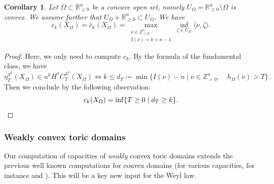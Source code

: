 \documentclass[11pt]{amsart}
\numberwithin{equation}{section}
\theoremstyle{plain}
\newtheorem{Coro}[coro]{Corollary}
\theoremstyle{definition}
\theoremstyle{remark}
\newcommand{\bZ} { {\mathbb{Z}}}
\newcommand{\bR} { {\mathbb{R}}}
\begin{document}
\begin{Coro}\label{prop: concave capacity}Let $\Omega \subset \bR^n_{\geq0}$ be a concave open set, namely $U_{\Omega}=\mathbb R_{\geq0}^n\setminus\Omega$ is convex. We assume further that $U_\Omega+\bR^n_{\geq 0} \subset U_\Omega$.  We have
\[{c}_k(X_{\Omega})
=
\widehat{c}_k(X_{\Omega})
=
\max_{\substack{\nu\in\bZ_{>0}^n\\ I(\nu)=k+n-1}}    
\inf_{\zeta\in {U_{\Omega}}}
\langle \nu,\zeta\rangle   .
\]

\end{Coro}\begin{proof}Here, we only need to compute $c_k$. By the formula of the fundamental class, we have
\[\eta_T^{S^1}(X_\Omega) \in u^kH^*C_T^{S^1}(X_\Omega) \iff k\leq d_T\coloneqq \min\{I(\nu)-n\mid \nu\in \bZ^n_{>0},\quad h_\Omega(\nu)>T\}.\]
Then we conclude by the following observation:
\[{c}_k(X_\Omega)=\inf\{T\geq 0\mid d_T\geq k\}.\qedhere\]  
\end{proof}
\subsubsection{Weakly convex toric domains}
Our computation of capacities of {\it weakly} convex toric domains extends the previous well known computations for convex domains (for various capacities, for instance \cite[Theorem 1.6]{gutthutchings2018capacities} and \cite[Theorem 3.7]{Capacities2021}). This will be a key new input for the Weyl law.
\end{document}
